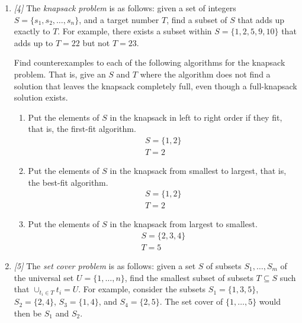 \documentclass[10pt, letterpaper]{article}
\numberwithin{equation}{section}
\begin{document}
\begin{enumerate}
        \item \textit{[4]} The \textit{knapsack problem} is as follows: given a set of integers
        $S = \{s_1, s_2, \ldots, s_n\}$, and a target number $T$, find a subset of $S$ that adds up
        exactly to $T$. For example, there exists a subset within $S = \{1, 2, 5, 9, 10\}$ that adds
        up to $T = 22$ but not $T = 23$.

        Find counterexamples to each of the following algorithms for the knapsack problem. That is,
        give an $S$ and $T$ where the algorithm does not find a solution that leaves the knapsack
        completely full, even though a full-knapsack solution exists.

        \begin{enumerate}
            \item Put the elements of $S$ in the knapsack in left to right order if they fit, that
            is, the first-fit algorithm.
            \begin{gather*}
                S = \{1, 2\} \\
                T = 2
            \end{gather*}

            \item Put the elements of $S$ in the knapsack from smallest to largest, that is, the
            best-fit algorithm.
            \begin{gather*}
                S = \{1, 2\} \\
                T = 2
            \end{gather*}

            \item Put the elements of $S$ in the knapsack from largest to smallest.
            \begin{gather*}
                S = \{2, 3, 4\} \\
                T = 5
            \end{gather*}
        \end{enumerate}

        \item \textit{[5]} The \textit{set cover problem} is as follows: given a set $S$ of subsets
        $S_1, \ldots, S_m$ of the universal set $U = \{1, \ldots, n\}$, find the smallest subset of
        subsets $T \subseteq S$ such that $\cup_{t_i \in T} t_i = U$. For example, consider the
        subsets $S_1 = \{1, 3, 5\}$, $S_2 = \{2, 4\}$, ${S_3 = \{1, 4\}}$, and $S_4 = \{2, 5\}$. The
        set cover of $\{1, \ldots, 5\}$ would then be $S_1$ and $S_2$.


\end{enumerate}
\end{document}

